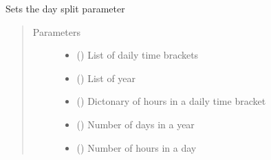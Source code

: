 \documentclass[a4paper,12pt,english]{article}
\begin{document}
\begin{fulllineitems}
\begin{fulllineitems}
\begin{quote}
\begin{description}
\end{description}\end{quote}

\end{fulllineitems}


\begin{fulllineitems}
\label{\detokenize{GOCPI:GOCPI.CreateCases.CreateCases.set_day_split}}
Sets the day split parameter
\begin{quote}\begin{description}
\item[{Parameters}] \leavevmode\begin{itemize}
\item {} 
 () \textendash{} List of daily time brackets

\item {} 
 () \textendash{} List of year

\item {} 
 () \textendash{} Dictonary of hours in a daily time bracket

\item {} 
 () \textendash{} Number of days in a year

\item {} 
 () \textendash{} Number of hours in a day

\end{itemize}

\end{description}\end{quote}

\end{fulllineitems}


\end{fulllineitems}
\end{document}
